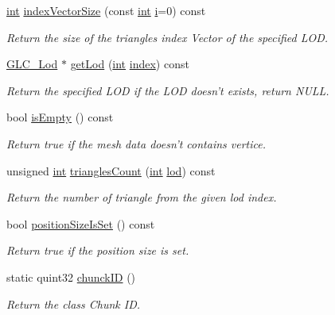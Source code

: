 \begin{DoxyCompactItemize}
\hyperlink{ioapi_8h_a787fa3cf048117ba7123753c1e74fcd6}{int} \hyperlink{class_g_l_c___mesh_data_aa78166c8840cb4144542b4d8f530ad1f}{index\-Vector\-Size} (const \hyperlink{ioapi_8h_a787fa3cf048117ba7123753c1e74fcd6}{int} \hyperlink{uavobjecttemplate_8m_a6f6ccfcf58b31cb6412107d9d5281426}{i}=0) const 
\begin{DoxyCompactList}\small\item\em Return the size of the triangles index Vector of the specified L\-O\-D. \end{DoxyCompactList}\item 
\hyperlink{class_g_l_c___lod}{G\-L\-C\-\_\-\-Lod} $\ast$ \hyperlink{class_g_l_c___mesh_data_aaf6280c02faea3f8da213684ce67eb84}{get\-Lod} (\hyperlink{ioapi_8h_a787fa3cf048117ba7123753c1e74fcd6}{int} \hyperlink{glext_8h_ab47dd9958bcadea08866b42bf358e95e}{index}) const 
\begin{DoxyCompactList}\small\item\em Return the specified L\-O\-D if the L\-O\-D doesn't exists, return N\-U\-L\-L. \end{DoxyCompactList}\item 
bool \hyperlink{class_g_l_c___mesh_data_a92dad5bdb17c1eb89de8f7b3f04bae80}{is\-Empty} () const 
\begin{DoxyCompactList}\small\item\em Return true if the mesh data doesn't contains vertice. \end{DoxyCompactList}\item 
unsigned \hyperlink{ioapi_8h_a787fa3cf048117ba7123753c1e74fcd6}{int} \hyperlink{class_g_l_c___mesh_data_af8bb5c71204e3c8ee0f6161405524319}{triangles\-Count} (\hyperlink{ioapi_8h_a787fa3cf048117ba7123753c1e74fcd6}{int} \hyperlink{glext_8h_a5b5a34b88a28ab9c203c2b432f6168b6}{lod}) const 
\begin{DoxyCompactList}\small\item\em Return the number of triangle from the given lod index. \end{DoxyCompactList}\item 
bool \hyperlink{class_g_l_c___mesh_data_af94284e6f1f6def4cc1ab1f984245198}{position\-Size\-Is\-Set} () const 
\begin{DoxyCompactList}\small\item\em Return true if the position size is set. \end{DoxyCompactList}\item 
static quint32 \hyperlink{class_g_l_c___mesh_data_a69248744981c66bb9de45a7e207ac1e2}{chunck\-I\-D} ()
\begin{DoxyCompactList}\small\item\em Return the class Chunk I\-D. \end{DoxyCompactList}\end{DoxyCompactItemize}


